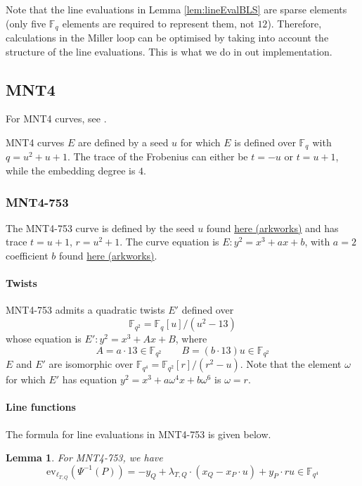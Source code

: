 \documentclass{article}
\newcommand{\ev}{\mathrm{ev}}
\newcommand{\fq}[1]{\mathbb{F}_{q^{#1}}}
\theoremstyle{remark}
\theoremstyle{plain}
\newtheorem{lemma}{Lemma}[section]
\begin{document}
Note that the line evaluations in Lemma \ref{lem:lineEvalBLS} are sparse elements (only five $\fq{}$ elements are required to represent them, not $12$).
Therefore, calculations in the Miller loop can be optimised by taking into account the structure of the line evaluations.
This is what we do in out implementation.

\subsection{MNT4}

For MNT4 curves, see \cite{MNT-curves}.

MNT4 curves $E$ are defined by a seed $u$ for which $E$ is defined over $\fq{}$ with $q = u^2 + u + 1$.
The trace of the Frobenius can either be $t = -u$ or $t = u+1$, while the embedding degree is $4$.

\subsubsection{MNT4-753}

The MNT4-753 curve is defined by the seed $u$ found \href{https://github.com/arkworks-rs/algebra/blob/master/curves/mnt4_753/src/lib.rs}{here (arkworks)} and has trace $t = u + 1$, $r = u^2 + 1$.
The curve equation is $E: y^2 = x^3 + ax + b$, with $a = 2$ coefficient $b$ found \href{https://github.com/arkworks-rs/algebra/blob/master/curves/mnt4_753/src/lib.rs}{here (arkworks)}.

\paragraph{Twists}
MNT4-753 admits a quadratic twists $E'$ defined over
\[
\fq{2} = \fq{}[u] / (u^2 - 13)
\]
whose equation is $E': y^2 = x^3 + Ax + B$, where
\[
    A = a \cdot 13 \in \fq{2} \quad \quad B = (b \cdot 13) u \in \fq{2}
\]
$E$ and $E'$ are isomorphic over $\fq{4} = \fq{2}[r] / (r^2 - u)$.
Note that the element $\omega$ for which $E'$ has equation $y^2 = x^3 + a \omega^4 x + b \omega^6$ is $\omega = r$.

\paragraph{Line functions}
The formula for line evaluations in MNT4-753 is given below.

\begin{lemma}
    For MNT4-753, we have
    \[
        \ev_{\ell_{T,Q}}(\Psi^{-1}(P)) = -y_Q + \lambda_{T,Q} \cdot (x_Q - x_P \cdot u) + y_P \cdot ru \in \fq{4}
    \]
\end{lemma}
\end{document}
